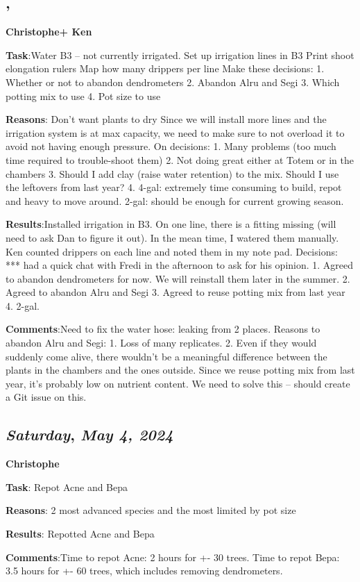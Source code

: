 \subsection*{\weekday, \day}
\textbf{Christophe+ Ken}
\par 
\textbf {Task}:Water B3 – not currently irrigated.
Set up irrigation lines in B3
Print shoot elongation rulers
Map how many drippers per line
Make these decisions:
1. Whether or not to abandon dendrometers
2. Abandon Alru and Segi
3. Which potting mix to use
4. Pot size to use
\par 
\textbf {Reasons}: Don’t want plants to dry
Since we will install more lines and the irrigation system is at max capacity, we need to make sure to not overload it to avoid not having enough pressure. 
On decisions:
1. Many problems (too much time required to trouble-shoot them)
2. Not doing great either at Totem or in the chambers
3. Should I add clay (raise water retention) to the mix. Should I use the leftovers from last year?
4. 4-gal: extremely time consuming to build, repot and heavy to move around. 2-gal: should be enough for current growing season. 
\par 
\textbf {Results}:Installed irrigation in B3. On one line, there is a fitting missing (will need to ask Dan to figure it out). In the mean time, I watered them manually.
Ken counted drippers on each line and noted them in my note pad. 
Decisions:
*** had a quick chat with Fredi in the afternoon to ask for his opinion.
1. Agreed to abandon dendrometers for now. We will reinstall them later in the summer.
2. Agreed to abandon Alru and Segi
3. Agreed to reuse potting mix from last year
4. 2-gal. 
\par 
\textbf {Comments}:Need to fix the water hose: leaking from 2 places. 
Reasons to abandon Alru and Segi: 1. Loss of many replicates. 2. Even if they would suddenly come alive, there wouldn’t be a meaningful difference between the plants in the chambers and the ones outside.  
Since we reuse potting mix from last year, it’s probably low on nutrient content. We need to solve this – should create a Git issue on this. 

\def\day{\textit{May 4, 2024}}
\def\weekday{\textit{Saturday}}
\subsection*{\weekday, \day}
\textbf{Christophe}
\par 
\textbf {Task}: Repot Acne and Bepa
\par 
\textbf {Reasons}: 2 most advanced species and the most limited by pot size
\par 
\textbf {Results}: Repotted Acne and Bepa
\par 
\textbf {Comments}:Time to repot Acne: 2 hours for +- 30 trees. 
Time to repot Bepa: 3.5 hours for +- 60 trees, which includes removing dendrometers.

